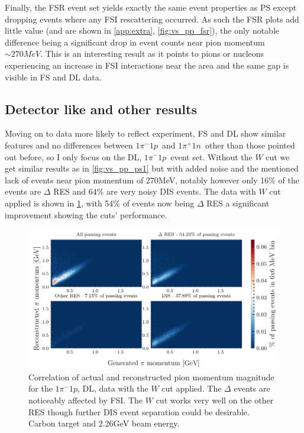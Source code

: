 \documentclass[a4paper,12pt]{article}
\newcommand{\md}{$1\pi^-1p$}
\newcommand{\pd}{$1\pi^+1n$}
\begin{document}
Finally, the FSR event set yields exactly the same event properties as PS except dropping events where any FSI rescattering occurred.
As such the FSR plots add little value (and are shown in \cref{app:extra}, \cref{fig:vs_pp_fsr}), the only notable difference being a significant drop in event counts near pion momentum $\sim 270\si{MeV}$.
This is an interesting result as it points to pions or nucleons experiencing an increase in FSI interactions near the area and the same gap is visible in FS and DL data.

\subsection{Detector like and other results}
Moving on to data more likely to reflect experiment, FS and DL show similar features and no differences between \md\ and \pd\ other than those pointed out before, so I only focus on the DL, \md\ event set.
Without the $W$ cut we get similar results as in \cref{fig:vs_pp_ps1} but with added noise and the mentioned lack of events near pion momentum of 270\si{MeV}, notably however only 16\% of the events are $\Delta$ RES and 64\% are very noisy DIS events.
The data with $W$ cut applied is shown in \cref{fig:vs_pp_dl_W}, with 54\% of events now being $\Delta$ RES a significant improvement showing the cuts' performance.

\begin{figure}[H]
    \centering
    \includegraphics{figures/python/vs_pp_C_m_dl_W.pdf}
    \caption{
        Correlation of actual and reconstructed pion momentum magnitude for the \md, DL, data with the $W$ cut applied.
        The $\Delta$ events are noticeably affected by FSI.
        The $W$ cut works very well on the other RES though further DIS event separation could be desirable.
        Carbon target and 2.26\si{GeV} beam energy.
    }\label{fig:vs_pp_dl_W}
\end{figure}
\end{document}
